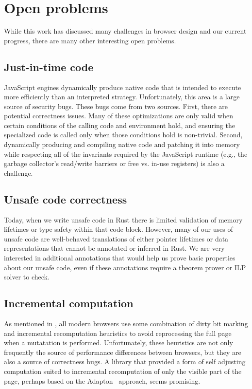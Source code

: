 
\section{Open problems}
\label{sec:open}
While this work has discussed many challenges in browser design and our current progress,
there are many other interesting open problems.

\subsection{Just-in-time code} JavaScript engines dynamically produce native code that is
intended to execute more efficiently than an interpreted strategy.
Unfortunately, this area is a large source of security bugs.
These bugs come from two sources.
First, there are potential correctness issues.
Many of these optimizations are only valid when certain conditions of the calling
code and environment hold, and ensuring the specialized code is called only when those
conditions hold is non-trivial.
Second, dynamically producing and compiling native code and patching it into memory
while respecting all of the invariants required by the JavaScript runtime (e.g., the
garbage collector's read/write barriers or free vs. in-use registers) is also a challenge.

\subsection{Unsafe code correctness} Today, when we write unsafe code in Rust
there is limited validation of memory lifetimes or type safety within that
code block.
However, many of our uses of unsafe code are well-behaved translations of
either pointer lifetimes or data representations that cannot be annotated
or inferred in Rust.
We are very interested in additional annotations that would help us prove
basic properties about our unsafe code, even if these annotations require a
theorem prover or ILP solver to check.

\subsection{Incremental computation} As mentioned in ,
all modern browsers use some combination of dirty bit marking and incremental
recomputation heuristics to avoid reprocessing the full page when
a mutatation is performed.
Unfortunately, these heuristics are not only frequently the source of
performance differences between browsers, but they are also a source of
correctness bugs.
A library that provided a form of self adjusting computation suited to
incremental recomputation of only the visible part of the page, perhaps
based on the Adapton~\cite{adapton} approach, seems promising.

